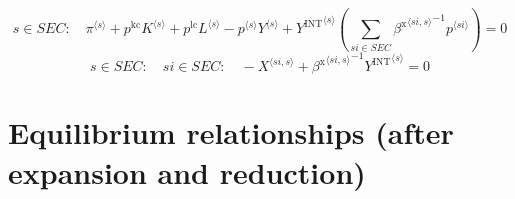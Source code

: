 \begin{equation}
s\in {S\!E\!C}\colon\quad {\pi}^{\langle s\rangle} + {p^{\mathrm{kc}}} {{K}^{\langle s\rangle}} + {p^{\mathrm{lc}}} {{L}^{\langle s\rangle}} - {{p}^{\langle s\rangle}} {{Y}^{\langle s\rangle}} + {{Y^{\mathrm{INT}}}^{\langle s\rangle}} \left(\sum_{{s\!i}\in {S\!E\!C}} {{\beta^{\mathrm{x}}}^{\langle {s\!i},s\rangle}}^{-1} {{p}^{\langle {s\!i}\rangle}}\right) = 0
\end{equation}
\begin{equation}
s\in {S\!E\!C}\colon\quad {s\!i}\in {S\!E\!C}\colon\quad -{X}^{\langle {s\!i},s\rangle} + {{\beta^{\mathrm{x}}}^{\langle {s\!i},s\rangle}}^{-1} {{Y^{\mathrm{INT}}}^{\langle s\rangle}} = 0
\end{equation}



\section{Equilibrium relationships (after expansion and reduction)}

